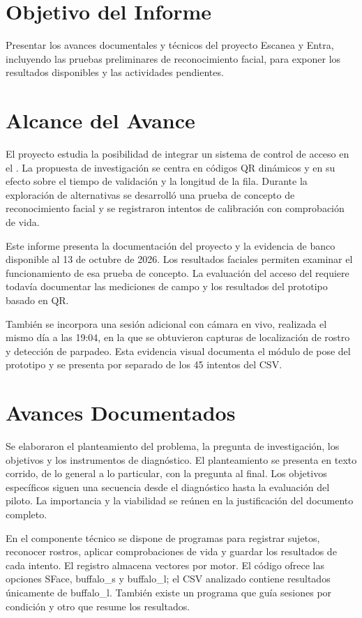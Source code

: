 \section{Objetivo del Informe}
Presentar los avances documentales y técnicos del proyecto Escanea y Entra,
incluyendo las pruebas preliminares de reconocimiento facial, para exponer
los resultados disponibles y las actividades pendientes.

\section{Alcance del Avance}
El proyecto estudia la posibilidad de integrar un sistema de control de
acceso en el \tescha{}. La propuesta de investigación se centra en códigos QR
dinámicos y en su efecto sobre el tiempo de validación y la longitud de la
fila. Durante la exploración de alternativas se desarrolló una prueba de
concepto de reconocimiento facial y se registraron intentos de calibración
con comprobación de vida.

Este informe presenta la documentación del proyecto y la evidencia de banco
disponible al 13 de octubre de 2026. Los resultados faciales permiten
examinar el funcionamiento de esa prueba de concepto. La evaluación del
acceso del \tescha{} requiere todavía documentar las mediciones de campo y los
resultados del prototipo basado en QR.

También se incorpora una sesión adicional con cámara en vivo, realizada el
mismo día a las 19:04, en la que se obtuvieron capturas de localización de
rostro y detección de parpadeo. Esta evidencia visual documenta el módulo de
pose del prototipo y se presenta por separado de los 45 intentos del CSV.

\section{Avances Documentados}
Se elaboraron el planteamiento del problema, la pregunta de investigación,
los objetivos y los instrumentos de diagnóstico. El planteamiento se
presenta en texto corrido, de lo general a lo particular, con la pregunta al
final. Los objetivos específicos siguen una secuencia desde el diagnóstico
hasta la evaluación del piloto. La importancia y la viabilidad se reúnen en
la justificación del documento completo.

En el componente técnico se dispone de programas para registrar sujetos,
reconocer rostros, aplicar comprobaciones de vida y guardar los resultados
de cada intento. El registro almacena vectores por motor. El código ofrece
las opciones SFace, buffalo\_s y buffalo\_l; el CSV analizado contiene
resultados únicamente de buffalo\_l. También existe un programa que guía
sesiones por condición y otro que resume los resultados.

